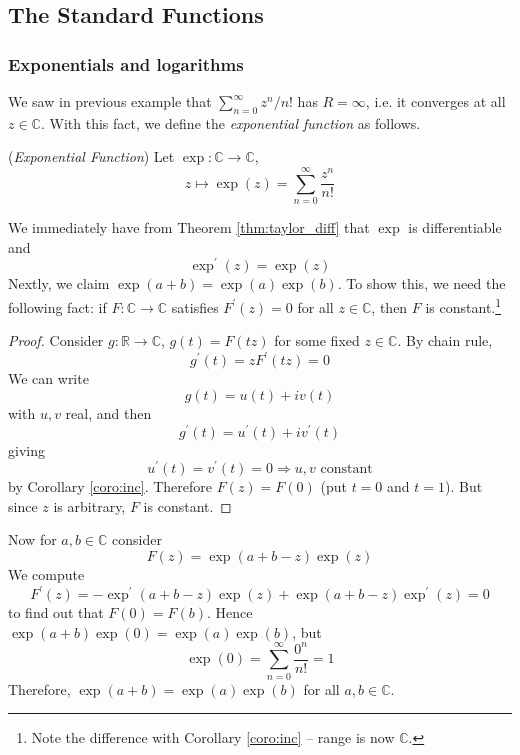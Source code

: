 \documentclass[10pt, a4paper, twoside]{report}
\begin{document}
\subsection{The Standard Functions}
\subsubsection{Exponentials and logarithms}
We saw in previous example that \(\sum_{n=0}^{\infty}z^n/n!\) has \(R=\infty\), i.e. it converges at all \(z\in\mathbb{C}\). With this fact, we define the \emph{exponential function} as follows.
\begin{definition} (\emph{Exponential Function})
    Let \(\exp:\mathbb{C}\to\mathbb{C}\),
    \[z\mapsto \exp(z)=\sum_{n=0}^{\infty}\frac{z^n}{n!}\]
    \label{def:exp}
\end{definition}
We immediately have from Theorem \ref{thm:taylor_diff} that \(\exp\) is differentiable and 
\[\exp^\prime(z)=\exp(z)\]
Nextly, we claim \(\exp(a+b)=\exp(a)\exp(b)\). To show this, we need the following fact: if \(F:\mathbb{C}\to\mathbb{C}\) satisfies \(F^\prime(z)=0\) for all \(z\in\mathbb{C}\), then \(F\) is constant.\footnote{Note the difference with Corollary \ref{coro:inc} -- range is now \(\mathbb{C}\).}
\begin{proof}
    Consider \(g:\mathbb{R}\to\mathbb{C}\), \(g(t)=F(tz)\) for some fixed \(z\in\mathbb{C}\). By chain rule,
    \[g^\prime(t)=zF^\prime(tz)=0\]
    We can write 
    \[g(t)=u(t)+iv(t)\]
    with \(u,v\) real, and then 
    \[g^\prime(t)=u^\prime(t)+iv^\prime(t)\]
    giving
    \[u^\prime(t)=v^\prime(t)=0\Rightarrow u,v\text{  constant}\]
    by Corollary \ref{coro:inc}. Therefore \(F(z)=F(0)\) (put \(t=0\) and \(t=1\)). But since \(z\) is arbitrary, \(F\) is constant.
\end{proof}
Now for \(a,b\in\mathbb{C}\) consider 
\[F(z)=\exp(a+b-z)\exp(z)\]
We compute 
\[F^\prime(z)=-\exp^\prime(a+b-z)\exp(z)+\exp(a+b-z)\exp^\prime(z)=0\]
to find out that \(F(0)=F(b)\). Hence \(\exp(a+b)\exp(0)=\exp(a)\exp(b)\), but
\[\exp(0)=\sum_{n=0}^{\infty}\frac{0^n}{n!}=1\]
Therefore, \(\exp(a+b)=\exp(a)\exp(b)\) for all \(a,b\in\mathbb{C}\).
\end{document}
